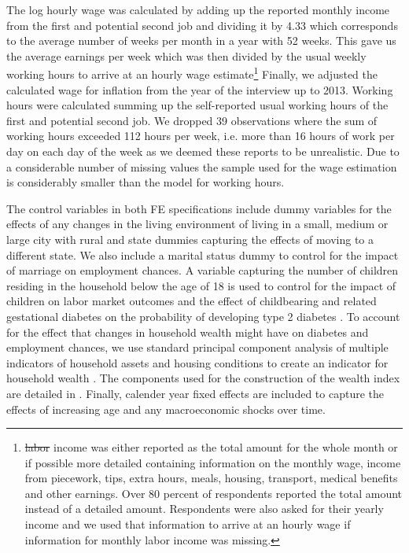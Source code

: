 \documentclass[12pt,english,british]{article}
\providecommand{\DIFaddtex}[1]{{\protect\color{blue}\uwave{#1}}} %
\providecommand{\DIFdeltex}[1]{{\protect\color{red}\sout{#1}}}                      %
\providecommand{\DIFaddbegin}{} %
\providecommand{\DIFaddend}{} %
\providecommand{\DIFdelbegin}{} %
\providecommand{\DIFdelend}{} %
\providecommand{\DIFadd}[1]{\texorpdfstring{\DIFaddtex{#1}}{#1}} %
\providecommand{\DIFdel}[1]{\texorpdfstring{\DIFdeltex{#1}}{}} %
\begin{document}
The log hourly wage was calculated by adding up the reported monthly
income from the first and potential second job and dividing it by
4.33 which corresponds to the average number of weeks per month in
a year with 52 weeks. This gave us the average earnings per week which
was then divided by the usual weekly working hours to arrive at an
hourly wage estimate\footnote{\DIFdelbegin \DIFdel{labor }\DIFdelend \DIFaddbegin \DIFadd{Labor }\DIFaddend income was either reported as the total amount for the whole
month or if possible more detailed containing information on the monthly
wage, income from piecework, tips, extra hours, meals, housing, transport,
medical benefits and other earnings. Over 80 percent of respondents
reported the total amount instead of a detailed amount. Respondents
were also asked for their yearly income and we used that information
to arrive at an hourly wage if information for monthly labor income
was missing.} Finally, we adjusted the calculated wage for inflation from the year
of the interview up to 2013. Working hours were calculated summing
up the self-reported usual working hours of the first and potential
second job. We dropped 39 observations where the sum of working hours
exceeded 112 hours per week, i.e. more than 16 hours of work per day
on each day of the week as we deemed these reports to be unrealistic.
Due to a considerable number of missing values the sample used for the wage estimation is considerably smaller than the model for working hours.

The control variables in both \ac{FE} specifications include dummy variables for the effects of any changes in the living environment
of living in a small, medium or large city with rural and state
dummies capturing the effects of moving to a different state. We also include a marital
status dummy to control for the impact of marriage on employment chances.
A variable capturing the number of children residing in the household
below the age of 18 is used to control for the impact of children
on labor market outcomes and the effect of childbearing and related
gestational diabetes on the probability of developing type 2 diabetes
\citep{Bellamy2009}. To account for the effect that changes in household
wealth might have on diabetes and employment chances, we use standard
principal component analysis of multiple indicators of household assets
and housing conditions to create an indicator for household wealth
\citep{Filmer2001}. The components used for the construction of the
wealth index are detailed in \citet{Seuring2015}. Finally, calender year fixed effects are included to capture the effects of increasing age and any macroeconomic shocks over time.
\end{document}
